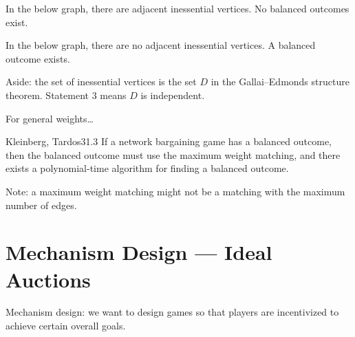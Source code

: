 \documentclass[12pt,letterpaper]{report}
\begin{document}
\begin{ex}
  In the below graph, there are adjacent inessential vertices.
  No balanced outcomes exist.
  \begin{center}
  \end{center}
  In the below graph, there are no adjacent inessential vertices.
  A balanced outcome exists.
  \begin{center}
  \end{center}
\end{ex}
Aside: the set of inessential vertices is the set $D$ in the Gallai--Edmonds structure theorem.
Statement 3 means $D$ is independent.

For general weights\dots

\begin{thm}{Kleinberg, Tardos}{31.3}
  If a network bargaining game has a balanced outcome, then the balanced outcome must use the
  maximum weight matching, and there exists a polynomial-time algorithm for finding a balanced
  outcome.
\end{thm}

Note: a maximum weight matching might not be a matching with the maximum number of edges.


\section{Mechanism Design --- Ideal Auctions}

Mechanism design: we want to design games so that players are incentivized to achieve certain
overall goals.
\end{document}
